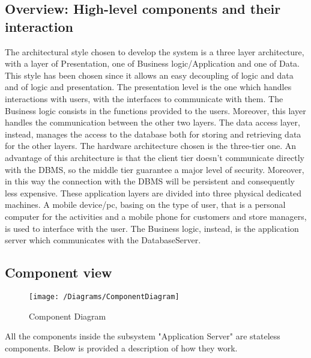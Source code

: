 \subsection{Overview: High-level components and their interaction}

The architectural style chosen to develop the system is a three layer architecture, with a layer of Presentation, one of Business logic/Application and one of Data. This style has been chosen since it allows an easy decoupling of logic and data and of logic and presentation. The presentation level is the one which handles interactions with users, with the interfaces to communicate with them.
The Business logic consists in the functions provided to the users. Moreover, this layer handles the communication between the other two layers. The data access layer, instead, manages the access to the database both for storing and retrieving data for the other layers. The hardware architecture chosen is the three-tier one. An advantage of this architecture is that the client tier doesn't communicate directly with the DBMS, so the middle tier guarantee a major level of security. Moreover, in this way the connection with the DBMS will be persistent and consequently less expensive. These application layers are divided into three physical dedicated machines. A mobile device/pc, basing on the type of user, that is a personal computer for the activities and a mobile phone for customers and store managers, is used to interface with the user. The Business logic, instead, is the application server which communicates with the DatabaseServer.

\subsection{Component view}
\begin{figure}[H]
	\centering
	\texttt{[image: /Diagrams/ComponentDiagram]}
	\caption{Component Diagram}
\end{figure}

All the components inside the subsystem "Application Server" are stateless components. Below is provided a description of how they work.

